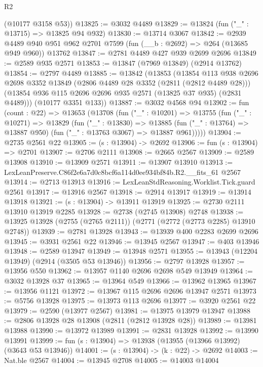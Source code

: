 \begin{lexlean}{R2}
\begin{coremodule}
      (@10177 @3158 @53))
@13825 := @3032 @4489
@13829 := @13824 (fun ("_" : @13715) => @13825 @94 @932)
@13830 := @13714 @3067
@13842 := @2939
    @4489
    @940
    @951
    @962
    @2701
    @7599
    (fun (__b : @2692) => @264 (@13685 @949 @960))
    @13762
@13847 := @2781 @4489 @427 @939 @2699 @2696
@13849 := @2589 @935 @2571
@13853 := @13847 (@7969 @13849) (@2914 @13762)
@13854 := @2797 @4489
@13885 := @13842
    (@13853
      (@13854
        @113
        @938
        @2696
        @2698
        @3352
        @13849
        (@2806 @4489 @28 @3352 (@2811 (@2812 @4489 @28)))
        (@13854 @936 @115 @2696 @2696 @935 @2571 (@13825 @37 @935) (@2831 @4489)))
      (@10177 @3351 @133))
@13887 := @3032 @4568 @94
@13902 := fun (count : @22) =>
  @13653
    (@13708
      (fun ("_" : @10201) =>
      @13755
        (fun ("_" : @10271) =>
        @13829
          (fun ("_" : @13830) =>
          @13885 (fun ("_" : @13764) => @13887 @950) (fun ("_" : @13763 @3067) => @13887 @961)))))
@13904 := @2735 @2561 @22
@13905 := (s : @13904) -> @2692
@13906 := fun (s : @13904) => @2701
@13907 := @2706 @2111
@13908 := @2665 @2567
@13909 := @2589 @13908
@13910 := @13909 @2571
@13911 := @13907 @13910
@13913 := LexLeanPreserve.C86f2e6a7d0c8bcf6a114d0ee934bf84b.R2.__fits_61 @2567
@13914 := @2713 @13913
@13916 := LexLeanStdReasoning.Worklist.Tick.guard @2561
@13917 := @13916 @2567
@13918 := @2914 @13917
@13919 := @13914 @13918
@13921 := (s : @13904) -> @13911 @13919
@13925 := @2730 @2111 @13910 @13919 @2285
@13928 := @2738 (@2745 @13908) @2748
@13938 := @13925 @13928 (@2755 (@2765 @2111)) (@2771 (@2772 (@2773 @2285) @13910 @2748))
@13939 := @2781 @13928
@13943 := @13939 @400 @2283 @2699 @2696
@13945 := @3931 @2561 @22
@13946 := @13945 @2567
@13947 := @403 @13946
@13948 := @2589 @13947
@13949 := @13948 @2571
@13955 := @13943 (@12204 @13949) (@2914 (@3505 @53 @13946))
@13956 := @2797 @13928
@13957 := @13956 @550
@13962 := @13957 @1140 @2696 @2698 @549 @13949
@13964 := @3032 @13928 @37
@13965 := @13964 @549
@13966 := @13962 @13965
@13967 := @13956 @1121
@13972 := @13967 @115 @2696 @2696 @13947 @2571
@13973 := @5756 @13928
@13975 := @13973 @113 @2696
@13977 := @3920 @2561 @22
@13979 := @2590 (@13977 @2567)
@13981 := @13975 @13979 @13947
@13988 := @2806 @13928 @28 @13908 (@2811 (@2812 @13928 @28))
@13989 := @13981 @13988
@13990 := @13972 @13989
@13991 := @2831 @13928
@13992 := @13990 @13991
@13999 := fun (s : @13904) => @13938 (@13955 (@13966 @13992) (@3643 @53 @13946))
@14001 := (s : @13904) -> (k : @22) -> @2692
@14003 := Nat.ble @2567
@14004 := @13945 @2708
@14005 := @14003 @14004

\end{coremodule}
\end{lexlean}
